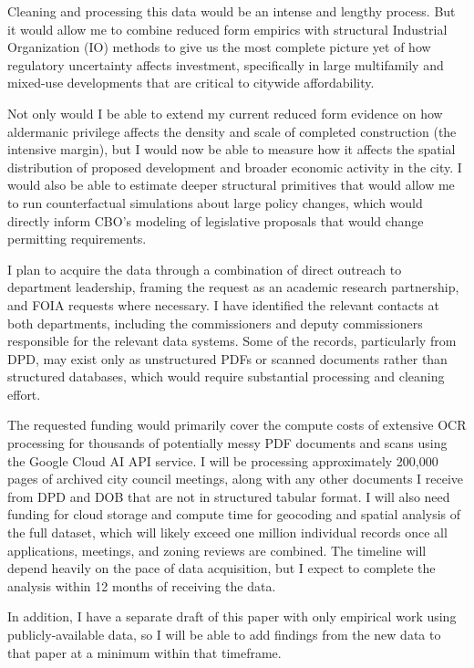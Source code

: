\documentclass[12pt]{article}
\begin{document}
Cleaning and processing this data would be an intense and lengthy process. But it would allow me to combine reduced form empirics with structural Industrial Organization (IO) methods to give us the most complete picture yet of how regulatory uncertainty affects investment, specifically in large multifamily and mixed-use developments that are critical to citywide affordability. 

Not only would I be able to extend my current reduced form evidence on how aldermanic privilege affects the density and scale of completed construction (the intensive margin), but I would now be able to measure how it affects the spatial distribution of proposed development and broader economic activity in the city. I would also be able to estimate deeper structural primitives that would allow me to run counterfactual simulations about large policy changes, which would directly inform CBO's modeling of legislative proposals that would change permitting requirements.

I plan to acquire the data through a combination of direct outreach to department leadership, framing the request as an academic research partnership, and FOIA requests where necessary. I have identified the relevant contacts at both departments, including the commissioners and deputy commissioners responsible for the relevant data systems. Some of the records, particularly from DPD, may exist only as unstructured PDFs or scanned documents rather than structured databases, which would require substantial processing and cleaning effort. 

The requested funding would primarily cover the compute costs of extensive OCR processing for thousands of potentially messy PDF documents and scans using the Google Cloud AI API service. I will be processing approximately 200,000 pages of archived city council meetings, along with any other documents I receive from DPD and DOB that are not in structured tabular format.
I will also need funding for cloud storage and compute time for geocoding and spatial analysis of the full dataset, which will likely exceed one million individual records once all applications, meetings, and zoning reviews are combined. 
The timeline will depend heavily on the pace of data acquisition, but I expect to complete the analysis within 12 months of receiving the data.

In addition, I have a separate draft of this paper with only empirical work using publicly-available data, so I will be able to add findings from the new data to that paper at a minimum within that timeframe. 
\end{document}
